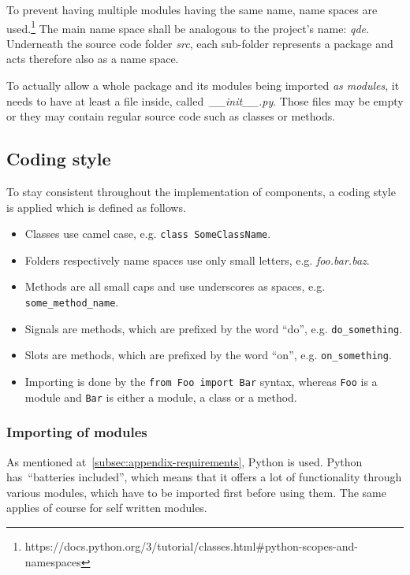 \documentclass[
    a4paper,      %
    10pt,         %
    openright,    %
    notitlepage,  %
    parskip=half, %
]{scrreprt}       %
\theoremstyle{definition}                    %
\begin{document}
To prevent having multiple modules having the same name, name spaces are
used.\footnote{https://docs.python.org/3/tutorial/classes.html\#python-scopes-and-namespaces}
The main name space shall be analogous to the project's name: \textit{qde}. Underneath
the source code folder \textit{src}, each sub-folder represents a package and acts
therefore also as a name space.

To actually allow a whole package and its modules being imported \textit{as modules},
it needs to have at least a file inside, called~\textit{\_\_init\_\_.py}. Those files may be
empty or they may contain regular source code such as classes or methods.

\subsection{Coding style}
\label{subsec:appendix-implementation-coding-style}

To stay consistent throughout the implementation of components, a coding style
is applied which is defined as follows.

\begin{itemize}
\item Classes use camel case, e.g. \verb+class SomeClassName+.
\item Folders respectively name spaces use only small letters, e.g.
  \textit{foo.bar.baz}.
\item Methods are all small caps and use underscores as spaces, e.g. \verb+some_method_name+.
\item Signals are methods, which are prefixed by the word \enquote{do}, e.g. \verb+do_something+.
\item Slots are methods, which are prefixed by the word \enquote{on}, e.g. \verb+on_something+.
\item Importing is done by the \verb+from Foo import Bar+ syntax, whereas
  \verb+Foo+ is a module and \verb+Bar+ is either a module, a class or a method.
\end{itemize}

\subsubsection{Importing of modules}
\label{ssubsec:appendix-implementation-coding-style-imports}

As mentioned at~\autoref{subsec:appendix-requirements}, Python is used. Python
has~\enquote{batteries included}, which means that it offers a lot of
functionality through various modules, which have to be imported first before
using them. The same applies of course for self written modules.
\end{document}
